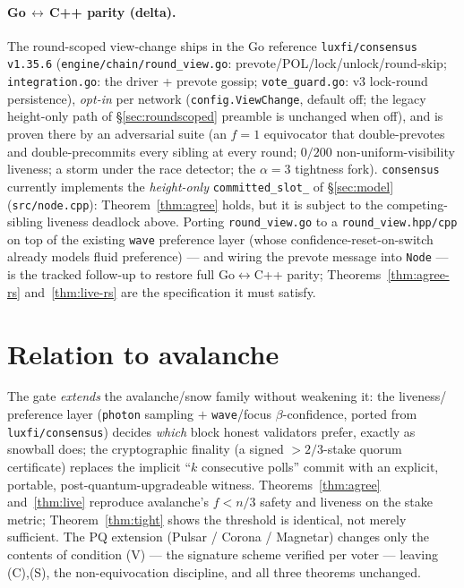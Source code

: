 \documentclass[11pt]{article}
\begin{document}
\paragraph{Go\,$\leftrightarrow$\,C++ parity (delta).}
The round-scoped view-change ships in the Go reference
\texttt{luxfi/consensus} \texttt{v1.35.6} (\texttt{engine/chain/round\_view.go}:
prevote/POL/lock/unlock/round-skip; \texttt{integration.go}: the driver + prevote
gossip; \texttt{vote\_guard.go}: v3 lock-round persistence), \emph{opt-in} per network
(\texttt{config.ViewChange}, default off; the legacy height-only path of
\S\ref{sec:roundscoped} preamble is unchanged when off), and is proven there by an
adversarial suite (an $f{=}1$ equivocator that double-prevotes and double-precommits every
sibling at every round; $0/200$ non-uniform-visibility liveness; a storm under the race
detector; the $\alpha{=}3$ tightness fork). \texttt{consensus} currently implements the
\emph{height-only} \texttt{committed\_slot\_} of \S\ref{sec:model} (\texttt{src/node.cpp}):
Theorem~\ref{thm:agree} holds, but it is subject to the competing-sibling liveness
deadlock above. Porting \texttt{round\_view.go} to a \texttt{round\_view.hpp/cpp} on top of
the existing \texttt{wave} preference layer (whose confidence-reset-on-switch already
models fluid preference) --- and wiring the prevote message into \texttt{Node} --- is the
tracked follow-up to restore full Go$\leftrightarrow$C++ parity; Theorems~\ref{thm:agree-rs}
and~\ref{thm:live-rs} are the specification it must satisfy.

\section{Relation to avalanche}

The gate \emph{extends} the avalanche/snow family without weakening it: the liveness/
preference layer (\texttt{photon} sampling $+$ \texttt{wave}/focus $\beta$-confidence,
ported from \texttt{luxfi/consensus}) decides \emph{which} block honest validators
prefer, exactly as snowball does; the cryptographic finality (a signed $>2/3$-stake
quorum certificate) replaces the implicit ``$k$ consecutive polls'' commit with an
explicit, portable, post-quantum-upgradeable witness. Theorems~\ref{thm:agree}
and~\ref{thm:live} reproduce avalanche's $f<n/3$ safety and liveness on the stake
metric; Theorem~\ref{thm:tight} shows the threshold is identical, not merely
sufficient. The PQ extension (Pulsar / Corona / Magnetar) changes only the contents
of condition (V) --- the signature scheme verified per voter --- leaving (C),(S), the
non-equivocation discipline, and all three theorems unchanged.
\end{document}
